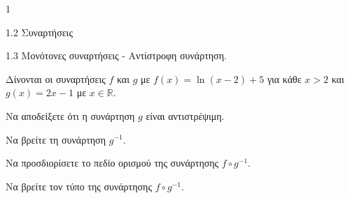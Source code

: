 \begin{ylh}{1}
    \item 1.2 Συναρτήσεις
    \item 1.3 Μονότονες συναρτήσεις - Αντίστροφη συνάρτηση.
\end{ylh}
Δίνονται οι συναρτήσεις $f$ και $g$ με $f(x) = \ln(x-2) + 5$ για κάθε $x > 2$ και $g(x) = 2x-1$ με $x \in \mathbb{R}$.
\begin{alist}
\item
    \begin{rlist}
    \item Να αποδείξετε ότι η συνάρτηση $g$ είναι αντιστρέψιμη. 
    \item Να βρείτε τη συνάρτηση $g^{-1}$. 
    \end{rlist}
\item
    \begin{rlist}
    \item Να προσδιορίσετε το πεδίο ορισμού της συνάρτησης $f \circ g^{-1}$. 
    \item Να βρείτε τον τύπο της συνάρτησης $f \circ g^{-1}$. 
    \end{rlist}
\end{alist}